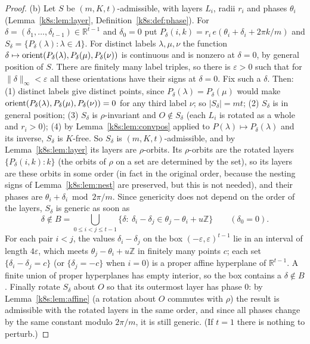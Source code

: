 \begin{proof}
(b) Let $S$ be $(m,K,t)$-admissible, with layers $L_i$, radii $r_i$ and phases $\theta_i$ (Lemma~\ref{k8s:lem:layer},
Definition~\ref{k8s:def:phase}). For $\delta=(\delta_1,\dots,\delta_{t-1})\in\mathbb R^{t-1}$ and $\delta_0=0$ put
$P_\delta(i,k)=r_i\,e(\theta_i+\delta_i+2\pi k/m)$ and $S_\delta=\{P_\delta(\lambda):\lambda\in\Lambda\}$. For distinct labels
$\lambda,\mu,\nu$ the function $\delta\mapsto\operatorname{orient}(P_\delta(\lambda),P_\delta(\mu),P_\delta(\nu))$ is continuous and is
nonzero at $\delta=0$, by general position of $S$. There are finitely many label triples, so there is $\varepsilon>0$
such that for $\|\delta\|_\infty<\varepsilon$ all these orientations have their signs at $\delta=0$. Fix such a
$\delta$. Then:
(1) distinct labels give distinct points, since $P_\delta(\lambda)=P_\delta(\mu)$ would make
$\operatorname{orient}(P_\delta(\lambda),P_\delta(\mu),P_\delta(\nu))=0$ for any third label $\nu$; so $|S_\delta|=mt$;
(2) $S_\delta$ is in general position;
(3) $S_\delta$ is $\rho$-invariant and $O\notin S_\delta$ (each $L_i$ is rotated as a whole and $r_i>0$);
(4) by Lemma~\ref{k8s:lem:convpos} applied to $P(\lambda)\mapsto P_\delta(\lambda)$ and its inverse, $S_\delta$ is $K$-free.
So $S_\delta$ is $(m,K,t)$-admissible, and by Lemma~\ref{k8s:lem:layer} its layers are $\rho$-orbits. Its $\rho$-orbits
are the rotated layers $\{P_\delta(i,k):k\}$ (the orbits of $\rho$ on a set are determined by the set), so its layers
are these orbits in some order (in fact in the original order, because the nesting signs of Lemma~\ref{k8s:lem:nest}
are preserved, but this is not needed), and their phases are $\theta_i+\delta_i\bmod 2\pi/m$. Since genericity does not
depend on the order of the layers, $S_\delta$ is generic as soon as
\[
\delta\notin B=\bigcup_{0\le i<j\le t-1}\{\delta:\ \delta_i-\delta_j\in\theta_j-\theta_i+u\mathbb Z\}\qquad(\delta_0=0).
\]
For each pair $i<j$, the values $\delta_i-\delta_j$ on the box $(-\varepsilon,\varepsilon)^{t-1}$ lie in an interval of
length $4\varepsilon$, which meets $\theta_j-\theta_i+u\mathbb Z$ in finitely many points $c$; each set
$\{\delta_i-\delta_j=c\}$ (or $\{\delta_j=-c\}$ when $i=0$) is a proper affine hyperplane of $\mathbb R^{t-1}$. A finite
union of proper hyperplanes has empty interior, so the box contains a $\delta\notin B$. Finally rotate $S_\delta$ about
$O$ so that its outermost layer has phase $0$: by Lemma~\ref{k8s:lem:affine} (a rotation about $O$ commutes with $\rho$)
the result is admissible with the rotated layers in the same order, and since all phases change by the same constant
modulo $2\pi/m$, it is still generic. (If $t=1$ there is nothing to perturb.)
\end{proof}

